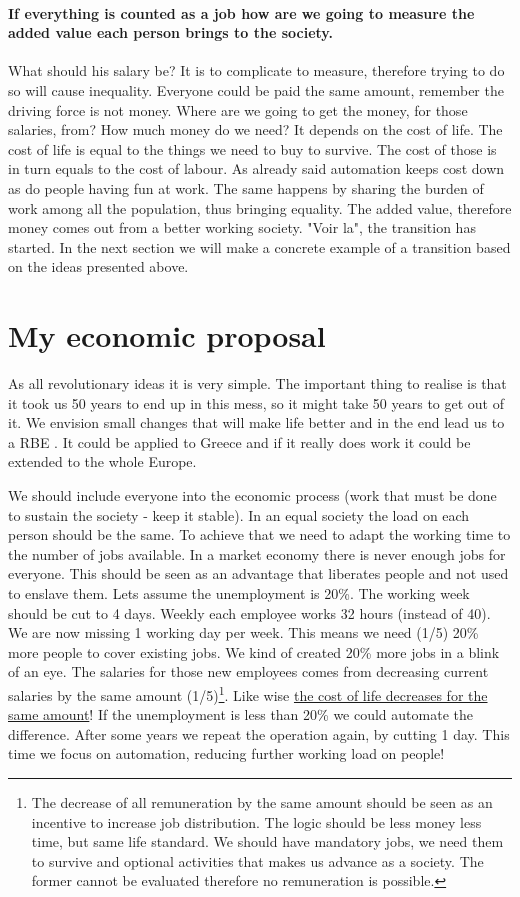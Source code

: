 \documentclass{article}
\begin{document}
\paragraph{If everything is counted as a job how are we going to measure the added value each person brings to the society.}
What should his salary be?
It is to complicate to measure, therefore trying to do so will cause inequality.
Everyone could be paid the same amount, remember the driving force is not money.
Where are we going to get the money, for those salaries, from?
How much money do we need?
It depends on the cost of life.
The cost of life is equal to the things we need to buy to survive.
The cost of those is in turn equals to the cost of labour.
As already said automation keeps cost down as do people having fun at work.
The same happens by sharing the burden of work among all the population, thus bringing equality.
The added value, therefore money comes out from a better working society.
"Voir la", the transition has started.
In the next section we will make a concrete example of a transition based on the ideas presented above.

\section{My economic proposal}
\label{sec:economic}
As all revolutionary ideas it is very simple.
The important thing to realise is that it took us 50 years to end up in this mess, so it might take 50 years to get out of it.
We envision small changes that will make life better and in the end lead us to a RBE \cite{rbe}.
It could be applied to Greece and if it really does work it could be extended to the whole Europe.

We should include everyone into the economic process (work that must be done to sustain the society - keep it stable).
In an equal society the load on each person should be the same.
To achieve that we need to adapt the working time to the number of jobs available.
In a market economy there is never enough jobs for everyone.
This should be seen as an advantage that liberates people and not used to enslave them.
Lets assume the unemployment is 20\%.
The working week should be cut to 4 days.
Weekly each employee works 32 hours (instead of 40).
We are now missing 1 working day per week.
This means we need (1/5) 20\% more people to cover existing jobs.
We kind of created 20\% more jobs in a blink of an eye.
The salaries for those new employees comes from decreasing current salaries by the same amount (1/5)\footnote{The decrease of all remuneration by the same amount should be seen as an incentive to increase job distribution. The logic should be less money less time, but same life standard. We should have mandatory jobs, we need them to survive and optional activities that makes us advance as a society. The former cannot be evaluated therefore no remuneration is possible.}.
Like wise \underline{the cost of life decreases for the same amount}!
If the unemployment is less than 20\% we could automate the difference.
After some years we repeat the operation again, by cutting 1 day.
This time we focus on automation, reducing further working load on people!
\end{document}
